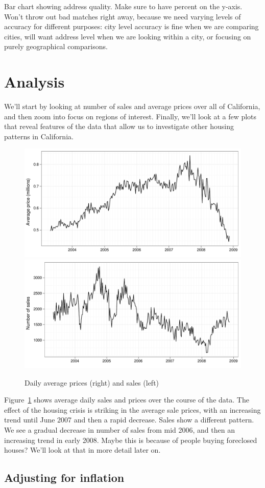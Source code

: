 \documentclass[oneside]{article}
\begin{document}
Bar chart showing address quality.  Make sure to have percent on the y-axis.  Won't throw out bad matches right away, because we need varying levels of accuracy for different purposes: city level accuracy is fine when we are comparing cities, will want address level when we are looking within a city, or focusing on purely geographical comparisons.

\section{Analysis}

We'll start by looking at number of sales and average prices over all of California, and then zoom into focus on regions of interest.  Finally, we'll look at a few plots that reveal features of the data that allow us to investigate other housing patterns in California.

\begin{figure}[htbp]
  \centering
    \includegraphics[width=0.5 \linewidth]{daily-price}%
    \includegraphics[width=0.5 \linewidth]{daily-sales}
  \caption{Daily average prices (right) and sales (left)}
  \label{fig:daily}
\end{figure}

Figure~\ref{fig:daily} shows average daily sales and prices over the course of the data.  The effect of the housing crisis is striking in the average sale prices, with an increasing trend until June 2007 and then a rapid decrease.  Sales show a different pattern.  We see a gradual decrease in number of sales from mid 2006, and then an increasing trend in early 2008. Maybe this is because of people buying foreclosed houses?  We'll look at that in more detail later on.

\subsection{Adjusting for inflation}
\end{document}
